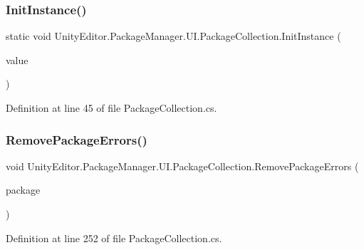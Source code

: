 \subsubsection{\texorpdfstring{InitInstance()}{InitInstance()}}
{\footnotesize\ttfamily static void Unity\+Editor.\+Package\+Manager.\+U\+I.\+Package\+Collection.\+Init\+Instance (\begin{DoxyParamCaption}\item[{ref \mbox{\hyperlink{class_unity_editor_1_1_package_manager_1_1_u_i_1_1_package_collection}{Package\+Collection}}}]{value }\end{DoxyParamCaption})\hspace{0.3cm}{\ttfamily [static]}}



Definition at line 45 of file Package\+Collection.\+cs.

\mbox{\label{class_unity_editor_1_1_package_manager_1_1_u_i_1_1_package_collection_a675bfec6785ec51c5f8c2d1d2aab3ff0}} 
\subsubsection{\texorpdfstring{RemovePackageErrors()}{RemovePackageErrors()}}
{\footnotesize\ttfamily void Unity\+Editor.\+Package\+Manager.\+U\+I.\+Package\+Collection.\+Remove\+Package\+Errors (\begin{DoxyParamCaption}\item[{\mbox{\hyperlink{class_unity_editor_1_1_package_manager_1_1_u_i_1_1_package}{Package}}}]{package }\end{DoxyParamCaption})}



Definition at line 252 of file Package\+Collection.\+cs.

\mbox{\label{class_unity_editor_1_1_package_manager_1_1_u_i_1_1_package_collection_a376f256e424d8ac231a101e35d83799b}} 
